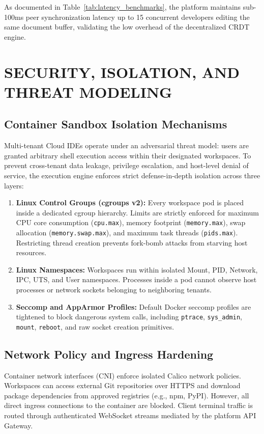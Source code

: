 \documentclass[12pt,a4paper]{report}
\begin{document}
As documented in Table~\ref{tab:latency_benchmarks}, the platform maintains sub-100ms peer synchronization latency up to 15 concurrent developers editing the same document buffer, validating the low overhead of the decentralized CRDT engine.

\chapter{SECURITY, ISOLATION, AND THREAT MODELING}

\section{Container Sandbox Isolation Mechanisms}
Multi-tenant Cloud IDEs operate under an adversarial threat model: users are granted arbitrary shell execution access within their designated workspaces. To prevent cross-tenant data leakage, privilege escalation, and host-level denial of service, the execution engine enforces strict defense-in-depth isolation across three layers:
\begin{enumerate}
    \item \textbf{Linux Control Groups (cgroups v2):} Every workspace pod is placed inside a dedicated cgroup hierarchy. Limits are strictly enforced for maximum CPU core consumption (\texttt{cpu.max}), memory footprint (\texttt{memory.max}), swap allocation (\texttt{memory.swap.max}), and maximum task threads (\texttt{pids.max}). Restricting thread creation prevents fork-bomb attacks from starving host resources.
    \item \textbf{Linux Namespaces:} Workspaces run within isolated Mount, PID, Network, IPC, UTS, and User namespaces. Processes inside a pod cannot observe host processes or network sockets belonging to neighboring tenants.
    \item \textbf{Seccomp and AppArmor Profiles:} Default Docker seccomp profiles are tightened to block dangerous system calls, including \texttt{ptrace}, \texttt{sys\_admin}, \texttt{mount}, \texttt{reboot}, and raw socket creation primitives.
\end{enumerate}

\section{Network Policy and Ingress Hardening}
Container network interfaces (CNI) enforce isolated Calico network policies. Workspaces can access external Git repositories over HTTPS and download package dependencies from approved registries (e.g., npm, PyPI). However, all direct ingress connections to the container are blocked. Client terminal traffic is routed through authenticated WebSocket streams mediated by the platform API Gateway.
\end{document}
